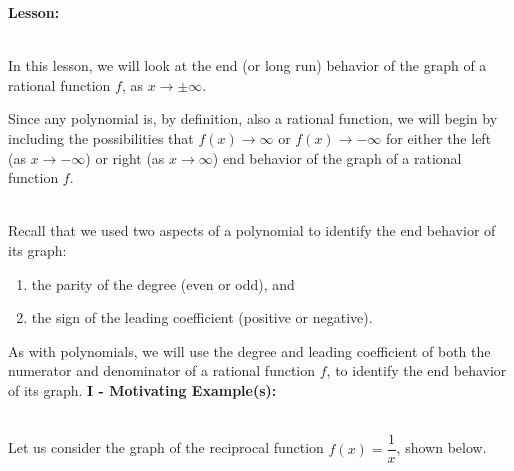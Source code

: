 \documentclass[12pt]{article}
\theoremstyle{definition}
\begin{document}
{\bf Lesson:}\\
\ \par
In this lesson, we will look at the end (or long run) behavior of the graph of a rational function $f$, as $x\rightarrow\pm\infty$.  
\begin{center}
\end{center}
Since any polynomial is, by definition, also a rational function, we will begin by including the possibilities that $f(x)\rightarrow\infty$ or $f(x)\rightarrow -\infty$ for either the left (as $x\rightarrow -\infty$) or right (as $x\rightarrow\infty$) end behavior of the graph of a rational function $f$.\\
\ \par
Recall that we used two aspects of a polynomial to identify the end behavior of its graph:
\begin{enumerate}
	\item the parity of the degree (even or odd), and
	\item the sign of the leading coefficient (positive or negative).
\end{enumerate}
As with polynomials, we will use the degree and leading coefficient of both the numerator and denominator of a rational function $f$, to identify the end behavior of its graph.
\newpage
{\bf I - Motivating Example(s):}\\
\ \par
Let us consider the graph of the reciprocal function $f(x)=\dfrac{1}{x}$, shown below.
\end{document}
